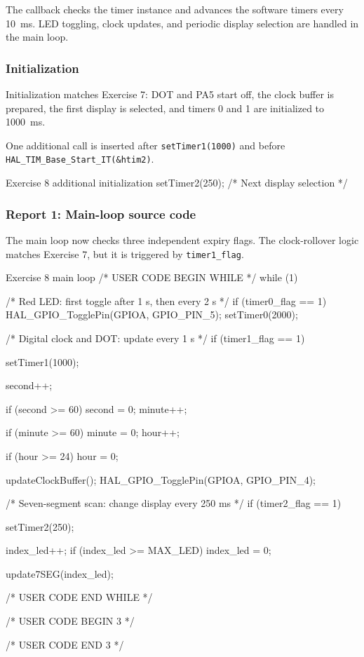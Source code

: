 \documentclass[a4paper]{article}
\begin{document}
The callback checks the timer instance and
advances the software timers every 10~ms.
LED toggling, clock updates, and periodic
display selection are handled in the main loop.

\subsubsection{Initialization}

Initialization matches Exercise 7:
DOT and PA5 start off, the clock buffer is
prepared, the first display is selected,
and timers 0 and 1 are initialized to 1000~ms.

One additional call is inserted after
\texttt{setTimer1(1000)} and before
\texttt{HAL\_TIM\_Base\_Start\_IT(\&htim2)}.

\begin{stmcode}{Exercise 8 additional initialization}
setTimer2(250);  /* Next display selection */
\end{stmcode}

\subsubsection{Report 1: Main-loop source code}

The main loop now checks three independent
expiry flags. The clock-rollover logic
matches Exercise 7, but it is triggered
by \texttt{timer1\_flag}.

\begin{stmcode}{Exercise 8 main loop}
/* USER CODE BEGIN WHILE */
while (1) {
    /* Red LED: first toggle after 1 s, then every 2 s */
    if (timer0_flag == 1) {
      HAL_GPIO_TogglePin(GPIOA, GPIO_PIN_5);
      setTimer0(2000);
    }

    /* Digital clock and DOT: update every 1 s */
    if (timer1_flag == 1) {
      setTimer1(1000);

      second++;

      if (second >= 60) {
        second = 0;
        minute++;
      }

      if (minute >= 60) {
        minute = 0;
        hour++;
      }

      if (hour >= 24) {
        hour = 0;
      }

      updateClockBuffer();
      HAL_GPIO_TogglePin(GPIOA, GPIO_PIN_4);
    }

    /* Seven-segment scan: change display every 250 ms */
    if (timer2_flag == 1) {
      setTimer2(250);

      index_led++;
      if (index_led >= MAX_LED) {
        index_led = 0;
      }

      update7SEG(index_led);
    }
    /* USER CODE END WHILE */

    /* USER CODE BEGIN 3 */
}
/* USER CODE END 3 */
\end{stmcode}
\end{document}

